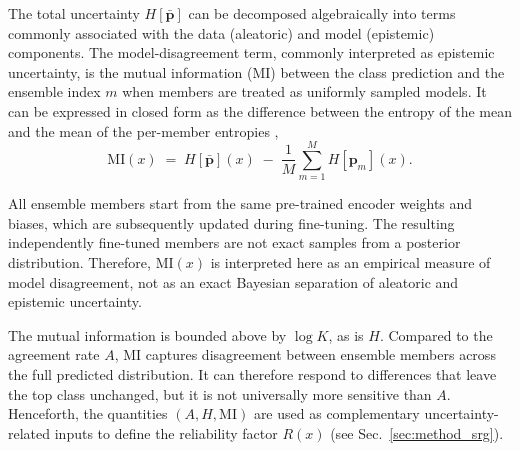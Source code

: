 The total uncertainty $H[\bar{\mathbf{p}}]$ can be decomposed algebraically into terms commonly associated with the data (aleatoric) and model (epistemic) components. The model-disagreement term, commonly interpreted as epistemic uncertainty, is the mutual information ($\mathrm{MI}$) between the class prediction and the ensemble index $m$ when members are treated as uniformly sampled models. It can be expressed in closed form as the difference between the entropy of the mean and the mean of the per-member entropies \citep{Houlsby2011,Depeweg2018},
\begin{equation}
\mathrm{MI}(x) \;=\; H[\bar{\mathbf{p}}](x) \;-\; \frac{1}{M}\sum_{m=1}^{M} H[\mathbf{p}_m](x).
\label{eq:MI}
\end{equation}

All ensemble members start from the same pre-trained encoder weights and biases, which are subsequently updated during fine-tuning. The resulting independently fine-tuned members are not exact samples from a posterior distribution. Therefore, $\mathrm{MI}(x)$ is interpreted here as an empirical measure of model disagreement, not as an exact Bayesian separation of aleatoric and epistemic uncertainty.

The mutual information is bounded above by $\log K$, as is $H$. Compared to the agreement rate $A$, $\mathrm{MI}$ captures disagreement between ensemble members across the full predicted distribution.
It can therefore respond to differences that leave the top class unchanged, but it is not universally more sensitive than $A$.
Henceforth, the quantities $(A,H,\mathrm{MI})$ are used as complementary uncertainty-related inputs to define the reliability factor $R(x)$ (see Sec.~\ref{sec:method_srg}).

